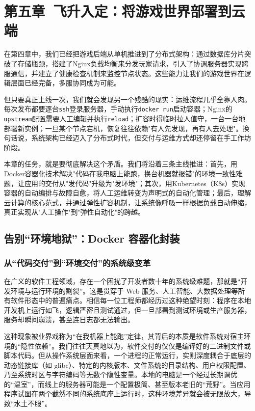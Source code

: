 \section{第五章\ 飞升入定：将游戏世界部署到云端}


在第四章中，我们已经把游戏后端从单机推进到了分布式架构：通过数据库分片突破了存储瓶颈，搭建了Nginx负载均衡来分发玩家请求，引入了协调服务器实现跨服通信，并建立了健康检查机制来监控节点状态。这些能力让我们的游戏世界在逻辑层面已经完备，多服协同成为可能。

但只要真正上线一次，我们就会发现另一个残酷的现实：运维流程几乎全靠人肉。每次发布都要逐台\texttt{ssh}登录服务器，手动执行\texttt{docker run}启动容器；Nginx的\texttt{upstream}配置需要人工编辑并执行\texttt{reload}；扩容时得临时拉人值守，一台一台地部署新实例；一旦某个节点宕机，恢复往往依赖"有人先发现，再有人去处理"。换句话说，系统架构已经迈入了分布式时代，但交付与运维方式却还停留在手工作坊阶段。

本章的任务，就是要彻底解决这个矛盾。我们将沿着三条主线推进：首先，用Docker容器化技术解决"代码在我电脑上能跑，换台机器就报错"的环境一致性难题，让应用的交付从"发代码"升级为"发环境"；其次，用Kubernetes（K8s）实现容器的自动编排与故障自愈，将人工运维转变为声明式的自动化管理；最后，理解云计算的核心范式，并通过弹性扩容机制，让系统像呼吸一样根据负载自动伸缩，真正实现从"人工操作"到"弹性自动化"的跨越。

\subsection{告别“环境地狱”：Docker 容器化封装}

\subsubsection{从“代码交付”到“环境交付”的系统级变革}

在广义的软件工程领域，存在一个困扰了开发者数十年的系统级难题，那就是“开发环境与运行环境的割裂”。这是贯穿于 Web 服务、人工智能、大数据处理等所有软件形态中的普遍痛点。相信每一位工程师都经历过这种绝望时刻：程序在本地开发机上运行如飞，逻辑严密且测试通过，但一旦部署到测试环境或生产服务器，服务却瞬间崩溃，甚至连日志都无法输出。

这种现象被业界戏称为“在我机器上能跑”定律，其背后的本质是软件系统对宿主环境的“隐性依赖”。我们往往天真地以为，软件交付的仅仅是编译好的二进制文件或脚本代码。但从操作系统层面来看，一个进程的正常运行，实则深度耦合于底层的动态链接库（如 glibc）、特定的内核版本、文件系统的目录结构、用户权限配置、乃至系统时区与字符编码等无数个隐性变量。本地的电脑是一个经过长期调优的“温室”，而线上的服务器可能是一个配置极简、甚至版本老旧的“荒野”。当应用程序试图在两个截然不同的系统底座上运行时，这种环境差异就会被无限放大，导致“水土不服”。

